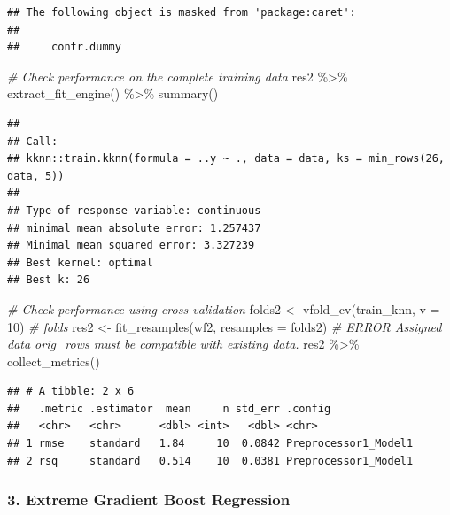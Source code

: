 \documentclass[
]{article}
\newenvironment{Shaded}{\begin{snugshade}}{\end{snugshade}}
\newcommand{\AttributeTok}[1]{\textcolor[rgb]{0.77,0.63,0.00}{#1}}
\newcommand{\CommentTok}[1]{\textcolor[rgb]{0.56,0.35,0.01}{\textit{#1}}}
\newcommand{\DecValTok}[1]{\textcolor[rgb]{0.00,0.00,0.81}{#1}}
\newcommand{\FunctionTok}[1]{\textcolor[rgb]{0.00,0.00,0.00}{#1}}
\newcommand{\NormalTok}[1]{#1}
\newcommand{\OtherTok}[1]{\textcolor[rgb]{0.56,0.35,0.01}{#1}}
\newcommand{\SpecialCharTok}[1]{\textcolor[rgb]{0.00,0.00,0.00}{#1}}
\begin{document}
\begin{verbatim}
## The following object is masked from 'package:caret':
## 
##     contr.dummy
\end{verbatim}

\begin{Shaded}
\begin{Highlighting}[]
\CommentTok{\# Check performance on the complete training data}
\NormalTok{res2 }\SpecialCharTok{\%\textgreater{}\%} 
    \FunctionTok{extract\_fit\_engine}\NormalTok{() }\SpecialCharTok{\%\textgreater{}\%} 
    \FunctionTok{summary}\NormalTok{()}
\end{Highlighting}
\end{Shaded}

\begin{verbatim}
## 
## Call:
## kknn::train.kknn(formula = ..y ~ ., data = data, ks = min_rows(26,     data, 5))
## 
## Type of response variable: continuous
## minimal mean absolute error: 1.257437
## Minimal mean squared error: 3.327239
## Best kernel: optimal
## Best k: 26
\end{verbatim}

\begin{Shaded}
\begin{Highlighting}[]
\CommentTok{\# Check performance using cross{-}validation}
\NormalTok{folds2 }\OtherTok{\textless{}{-}} \FunctionTok{vfold\_cv}\NormalTok{(train\_knn, }\AttributeTok{v =} \DecValTok{10}\NormalTok{)}
\CommentTok{\# folds}
\NormalTok{res2 }\OtherTok{\textless{}{-}} \FunctionTok{fit\_resamples}\NormalTok{(wf2, }\AttributeTok{resamples =}\NormalTok{ folds2) }\CommentTok{\# ERROR Assigned data \textasciigrave{}orig\_rows\textasciigrave{} must be compatible with existing data.}
\NormalTok{res2 }\SpecialCharTok{\%\textgreater{}\%} 
    \FunctionTok{collect\_metrics}\NormalTok{()}
\end{Highlighting}
\end{Shaded}

\begin{verbatim}
## # A tibble: 2 x 6
##   .metric .estimator  mean     n std_err .config             
##   <chr>   <chr>      <dbl> <int>   <dbl> <chr>               
## 1 rmse    standard   1.84     10  0.0842 Preprocessor1_Model1
## 2 rsq     standard   0.514    10  0.0381 Preprocessor1_Model1
\end{verbatim}

\hypertarget{extreme-gradient-boost-regression}{%
\subsubsection{3. Extreme Gradient Boost
Regression}\label{extreme-gradient-boost-regression}}
\end{document}
